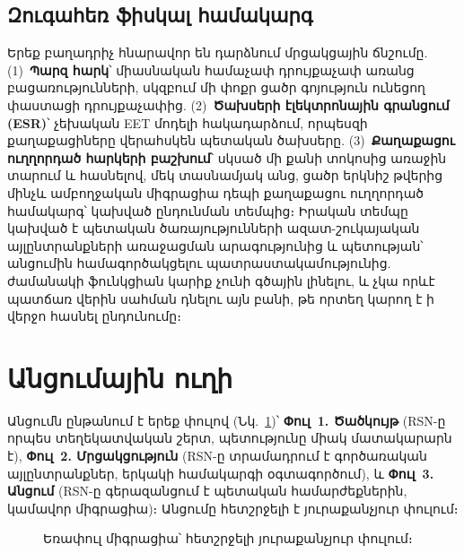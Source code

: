\documentclass[11pt,a4paper,twocolumn]{article}
\begin{document}
\subsection{Զուգահեռ ֆիսկալ համակարգ}

Երեք բաղադրիչ հնարավոր են դարձնում մրցակցային ճնշումը. (1)~\textbf{Պարզ հարկ}՝ միասնական համաչափ դրույքաչափ առանց բացառությունների, սկզբում մի փոքր ցածր գոյություն ունեցող փաստացի դրույքաչափից. (2)~\textbf{Ծախսերի էլեկտրոնային գրանցում (ESR)}՝ չեխական EET մոդելի հակադարձում, որպեսզի քաղաքացիները վերահսկեն պետական ծախսերը. (3)~\textbf{Քաղաքացու ուղղորդած հարկերի բաշխում}՝ սկսած մի քանի տոկոսից առաջին տարում և հասնելով, մեկ տասնամյակ անց, ցածր երկնիշ թվերից մինչև ամբողջական միգրացիա դեպի քաղաքացու ուղղորդած համակարգ՝ կախված ընդունման տեմպից։ Իրական տեմպը կախված է պետական ծառայությունների ազատ-շուկայական այլընտրանքների առաջացման արագությունից և պետության՝ անցումին համագործակցելու պատրաստակամությունից. ժամանակի ֆունկցիան կարիք չունի գծային լինելու, և չկա որևէ պատճառ վերին սահման դնելու այն բանի, թե որտեղ կարող է ի վերջո հասնել ընդունումը։

\section{Անցումային ուղի}

Անցումն ընթանում է երեք փուլով (Նկ.~\ref{fig:migration})՝ \textbf{Փուլ~1. Ծածկույթ} (RSN-ը որպես տեղեկատվական շերտ, պետությունը միակ մատակարարն է), \textbf{Փուլ~2. Մրցակցություն} (RSN-ը տրամադրում է գործառական այլընտրանքներ, երկակի համակարգի օգտագործում), և \textbf{Փուլ~3. Անցում} (RSN-ը գերազանցում է պետական համարժեքներին, կամավոր միգրացիա)։ Անցումը հետշրջելի է յուրաքանչյուր փուլում։

\begin{figure}[ht]
\centering
{}
\caption{Եռափուլ միգրացիա՝ հետշրջելի յուրաքանչյուր փուլում։}
\label{fig:migration}
\end{figure}
\end{document}
